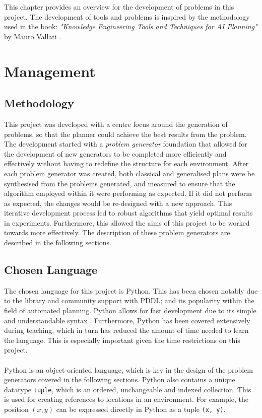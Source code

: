 This chapter provides an overview for the development of problems in this project. The development of tools and problems is inspired by the methodology used in the book: \textit{"Knowledge Engineering Tools and Techniques for AI Planning"} by Mauro Vallati \cite{strobel_mypddl_2020}.

\section{Management}
\subsection{Methodology}
This project was developed with a centre focus around the generation of problems, so that the planner could achieve the best results from the problem. The development started with a \textit{problem generator} foundation that allowed for the development of new generators to be completed more efficiently and effectively without having to redefine the structure for each environment. After each problem generator was created, both classical and generalised plans were be synthesised from the problems generated, and measured to ensure that the algorithm employed within it were performing as expected. If it did not perform as expected, the changes would be re-designed with a new approach. This iterative development process led to robust algorithms that yield optimal results in experiments. Furthermore, this allowed the aims of this project to be worked towards more effectively. The description of these problem generators are described in the following sections.

\subsection{Chosen Language}
The chosen language for this project is Python. This has been chosen notably due to the library and community support with PDDL; and its popularity within the field of automated planning. Python allows for fast development due to its simple and understandable syntax \cite{druzhinina_why_2023}\cite{scarlett_why_2023}. Furthermore, Python has been covered extensively during teaching, which in turn has reduced the amount of time needed to learn the language. This is especially important given the time restrictions on this project.\\\\
Python is an object-oriented language, which is key in the design of the problem generators covered in the following sections. Python also contains a unique datatype \texttt{tuple}, which is an ordered, unchangeable and indexed collection. This is used for creating references to locations in an environment. For example, the position $(x, y)$ can be expressed directly in Python as a tuple \texttt{(x, y)}.

